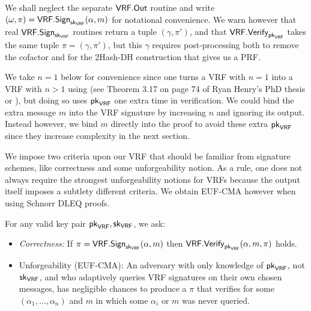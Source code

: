 {We shall neglect the separate $\mathsf{VRF}.\mathsf{Out}$ routine and write $(\omega,\pi) = \mathsf{VRF}.\mathsf{Sign}_{\mathsf{sk}_{\mathsf{VRF}}}(\alpha,m)$ for notational convenience.  We warn however that real $\mathsf{VRF}.\mathsf{Sign}_{\mathsf{sk}_{\mathsf{VRF}}}$ routines return a tuple $(\gamma,\pi')$, and that $\mathsf{VRF}.\mathsf{Verify}_{\mathsf{pk}_{\mathsf{VRF}}}$ takes the same tuple $\pi = (\gamma,\pi')$, but this $\gamma$ requires post-processing both to remove the cofactor and for the 2Hash-DH construction that gives us a PRF.

We take $n=1$ below for convenience since one turns a VRF with $n=1$ into a VRF with $n>1$ using 
\cite[\S3.2.1]{PrivacyPass} (see Theorem 3.17 on page 74 of Ryan Henry's PhD thesis \cite{RyanHenryPhD} or \cite{HenryGoldberg13}), but doing so uses $\mathsf{pk}_{\mathsf{VRF}}$ one extra time in verification.  
We could bind the extra message $m$ into the VRF signature by increasing $n$ and ignoring its output.  Instead however, we bind $m$ directly into the proof to avoid these extra $\mathsf{pk}_{\mathsf{VRF}}$ since they increase complexity in the next section.

We impose two criteria upon our VRF that should be familiar from signature schemes, like correctness and some unforgeability notion.  As a rule, one does not always require the strongest unforgeability notions for VRFs because the output itself imposes a subtlety different criteria.  We obtain EUF-CMA however when using Schnorr DLEQ proofs. 

For any valid key pair $\mathsf{pk}_{\mathsf{VRF}},\mathsf{sk}_{\mathsf{VRF}}$, we ask:
\begin{itemize}
\item {\em Correctness:}
If $\pi = \mathsf{VRF}.\mathsf{Sign}_{\mathsf{sk}_{\mathsf{VRF}}}(\alpha,m)$ then $\mathsf{VRF}.\mathsf{Verify}_{\mathsf{pk}_{\mathsf{VRF}}}(\alpha,m,\pi)$ holds.
\item {\rm Unforgeability (EUF-CMA):} 
An adversary with only knowledge of $\mathsf{pk}_{\mathsf{VRF}}$, not $\mathsf{sk}_{\mathsf{VRF}}$, and who adaptively queries VRF signatures on their own chosen messages, has negligible chances to produce a $\pi$ that verifies for some $(\alpha_1,\ldots,\alpha_n)$ and $m$ in which some $\alpha_i$ or $m$ was never queried.
\end{itemize}

}
